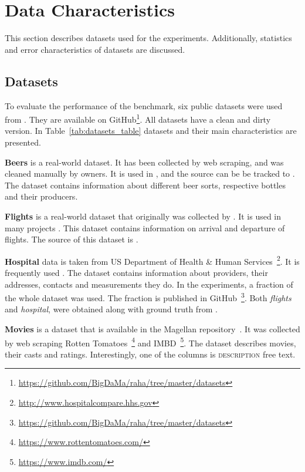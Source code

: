 \section{Data Characteristics}
\label{sec:data_charcteristics}

This section describes datasets used for the experiments.
Additionally, statistics and error characteristics of datasets are discussed.

\subsection{Datasets}



To evaluate the performance of the benchmark, six public datasets were used from \textcite{MahdaviAFMQST2019, MahdaviA2020}. 
They are available on GitHub\footnote{\url{https://github.com/BigDaMa/raha/tree/master/datasets}}.
All datasets have a clean and dirty version.
In Table~\ref{tab:datasets_table} datasets and their main characteristics are presented.

\textbf{Beers} is a real-world dataset. It has been collected by web scraping, and was cleaned manually by owners.
It is used in \textcite{MahdaviAFMQST2019, MahdaviA2020},
and the source can be be tracked to \textcite{Hould2017WEB, Hould2017KAGGLE}. 
The dataset contains information about different beer sorts, respective bottles and their producers.

\textbf{Flights} is a real-world dataset that originally was collected by \textcite{LiDLMS2015}. 
It is used in many projects \cite{HeidariMIR2019, raha, LiDLMS2015}.
This dataset contains information on arrival and departure of flights.
The source of this dataset is \textcite{LiDLMS2015}.

\textbf{Hospital} data is taken from US Department of Health \& Human Services~\footnote{\url{http://www.hospitalcompare.hhs.gov}}. 
It is frequently used \cite{RestatGCS2022, ChuIP2013, DallachiesaEEEIOT2013, HeidariMIR2019,MahdaviAFMQST2019, MahdaviA2020, RekatsinasCIR2017}.
The dataset contains information about providers, their addresses, contacts and measurements they do.
In the experiments, a fraction of the whole dataset was used.
The fraction is published in GitHub~\footnote{\url{https://github.com/BigDaMa/raha/tree/master/datasets}}.
Both \textit{flights} and \textit{hospital}, were obtained along with ground truth from \textcite{HeidariMIR2019}.

\textbf{Movies} is a dataset that is available in the Magellan repository~\cite{DasDGGKGP2016, KondaDSDABLPZNPKDR2016}.
It was collected by web scraping Rotten Tomatoes~\footnote{\url{https://www.rottentomatoes.com/}} and IMBD~\footnote{\url{https://www.imdb.com/}}.
The dataset describes movies, their casts and ratings. 
Interestingly, one of the columns is \textsc{description} free text.


